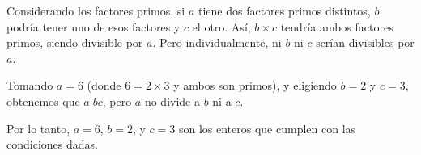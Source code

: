 \documentclass[12pt,a4paper]{article}
\begin{document}
Considerando los factores primos, si \(a\) tiene dos factores primos distintos, \(b\) podría tener uno de esos factores y \(c\) el otro. Así, \(b \times c\) tendría ambos factores primos, siendo divisible por \(a\). Pero individualmente, ni \(b\) ni \(c\) serían divisibles por \(a\).

Tomando \(a = 6\) (donde \(6 = 2 \times 3\) y ambos son primos), y eligiendo \(b = 2\) y \(c = 3\), obtenemos que \(a | bc\), pero \(a\) no divide a \(b\) ni a \(c\).

Por lo tanto, \(a = 6\), \(b = 2\), y \(c = 3\) son los enteros que cumplen con las condiciones dadas.
\end{document}
